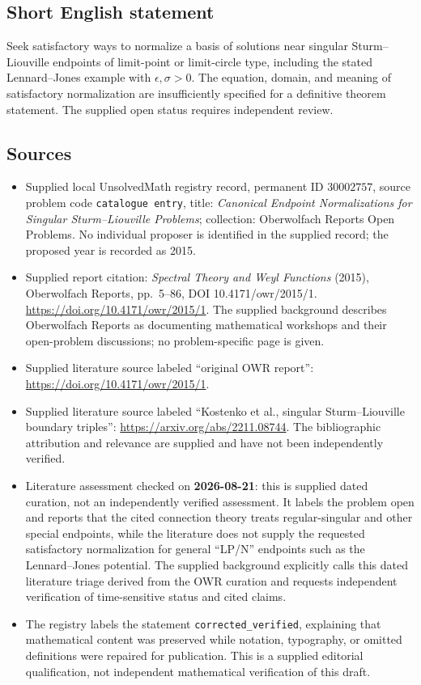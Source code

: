 \documentclass[11pt]{article}
\begin{document}
\subsection{Short English statement}
Seek satisfactory ways to normalize a basis of solutions near singular Sturm--Liouville endpoints of limit-point or limit-circle type, including the stated Lennard--Jones example with \(\epsilon,\sigma>0\). The equation, domain, and meaning of satisfactory normalization are insufficiently specified for a definitive theorem statement. The supplied open status requires independent review.
\subsection{Sources}
\begin{itemize}
\item Supplied local UnsolvedMath registry record, permanent ID \(30002757\), source problem code \texttt{catalogue entry}, title: \emph{Canonical Endpoint Normalizations for Singular Sturm--Liouville Problems}; collection: Oberwolfach Reports Open Problems. No individual proposer is identified in the supplied record; the proposed year is recorded as 2015.
\item Supplied report citation: \emph{Spectral Theory and Weyl Functions} (2015), Oberwolfach Reports, pp.~5--86, DOI 10.4171/owr/2015/1. \url{https://doi.org/10.4171/owr/2015/1}. The supplied background describes Oberwolfach Reports as documenting mathematical workshops and their open-problem discussions; no problem-specific page is given.
\item Supplied literature source labeled ``original OWR report'': \url{https://doi.org/10.4171/owr/2015/1}.
\item Supplied literature source labeled ``Kostenko et al., singular Sturm--Liouville boundary triples'': \url{https://arxiv.org/abs/2211.08744}. The bibliographic attribution and relevance are supplied and have not been independently verified.
\item Literature assessment checked on \textbf{2026-08-21}: this is supplied dated curation, not an independently verified assessment. It labels the problem open and reports that the cited connection theory treats regular-singular and other special endpoints, while the literature does not supply the requested satisfactory normalization for general ``LP/N'' endpoints such as the Lennard--Jones potential. The supplied background explicitly calls this dated literature triage derived from the OWR curation and requests independent verification of time-sensitive status and cited claims.
\item The registry labels the statement \texttt{corrected\_verified}, explaining that mathematical content was preserved while notation, typography, or omitted definitions were repaired for publication. This is a supplied editorial qualification, not independent mathematical verification of this draft.
\end{itemize}
\end{document}
